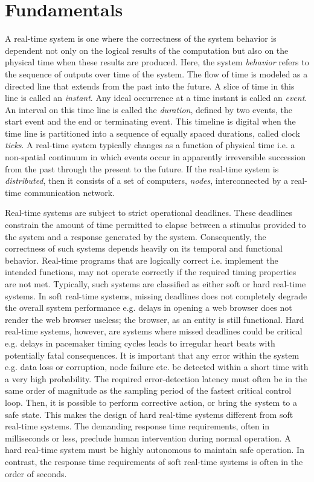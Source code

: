 \chapter{Fundamentals}
\label{chapter:fundamentals}

A real-time system \cite{liu2000real} is one where the correctness of the system behavior is dependent not only on the logical results of the computation but also on the physical time when these results are produced. Here, the system \emph{behavior} refers to the sequence of outputs over time of the system. The flow of time is modeled as a directed line that extends from the past into the future. A slice of time in this line is called an \emph{instant}. Any ideal occurrence at a time instant is called an \emph{event}. An interval on this time line is called the \emph{duration}, defined by two events, the start event and the end or terminating event. This timeline is digital when the time line is partitioned into a sequence of equally spaced durations, called clock \emph{ticks}. A real-time system typically changes as a function of physical time i.e. a non-spatial continuum in which events occur in apparently irreversible succession from the past through the present to the future. If the real-time system is \emph{distributed}, then it consists of a set of computers, \emph{nodes}, interconnected by a real-time communication network.

Real-time systems are subject to strict operational deadlines. These deadlines constrain the amount of time permitted to elapse between a stimulus provided to the system and a response generated by the system. Consequently, the correctness of such systems depends heavily on its temporal and functional behavior. Real-time programs that are logically correct i.e. implement the intended functions, may not operate correctly if the required timing properties are not met. Typically, such systems are classified as either soft or hard real-time systems. In soft real-time systems, missing deadlines does not completely degrade the overall system performance e.g. delays in opening a web browser does not render the web browser useless; the browser, as an entity is still functional. Hard real-time systems, however, are systems where missed deadlines could be critical e.g. delays in pacemaker timing cycles leads to irregular heart beats with potentially fatal consequences. It is important that any error within the system e.g. data loss or corruption, node failure etc. be detected within a short time with a very high probability. The required error-detection latency must often be in the same order of magnitude as the sampling period of the fastest critical control loop. Then, it is possible to perform corrective action, or bring the system to a safe state. This makes the design of hard real-time systems different from soft real-time systems. The demanding response time requirements, often in milliseconds or less, preclude human intervention during normal operation. A hard real-time system must be highly autonomous to maintain safe operation. In contrast, the response time requirements of soft real-time systems is often in the order of seconds. 

